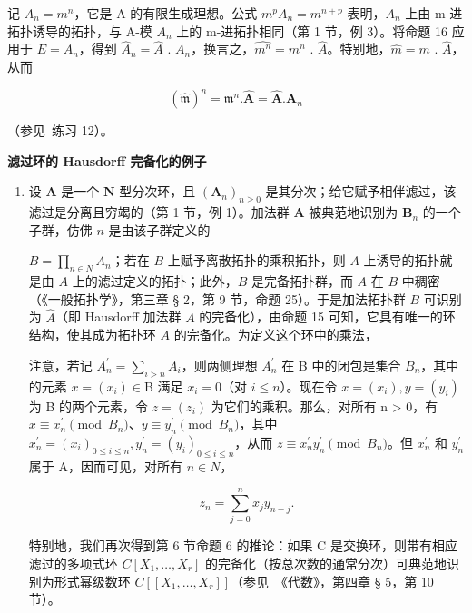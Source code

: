 记 \(A_{n} = m^{n}\)，它是 A 的有限生成理想。公式 \(m^{p}A_{n} = m^{n+p}\) 表明，\(A_{n}\) 上由 m-进拓扑诱导的拓扑，与 A-模 \(A_{n}\) 上的 m-进拓扑相同（第 1 节，例 3）。将命题 16 应用于 \(E = A_{n}\)，得到 \(\hat{A}_{n} = \hat{A}\) . \(A_{n}\)，换言之，\(\widehat{m^{n}} = m^{n}\) . \(\hat{A}\)。特别地，\(\hat{m} = m\) . \(\hat{A}\)，从而

\[
(\hat {\mathfrak {m}}) ^ {n} = \mathfrak {m} ^ {n}. \hat {\mathbf {A}} = \hat {\mathbf {A}}. \mathbf {A} _ {n}
\]

（参见~练习 12）。

\textbf{滤过环的 Hausdorff 完备化的例子}\par

\begin{enumerate}
\def\labelenumi{(\arabic{enumi})}
\tightlist
\item
  设 \(\mathbf{A}\) 是一个 \(\mathbf{N}\) 型分次环，且 \((\mathbf{A}_n)_{n\geqslant 0}\) 是其分次；给它赋予相伴滤过，该滤过是分离且穷竭的（第 1 节，例 1）。加法群 \(\mathbf{A}\) 被典范地识别为 \(\mathbf{B}_{n}\) 的一个子群，仿佛 \(n\) 是由该子群定义的

\(B = \prod_{n \in N} A_n\)；若在 \(B\) 上赋予离散拓扑的乘积拓扑，则 \(A\) 上诱导的拓扑就是由 \(A\) 上的滤过定义的拓扑；此外，\(B\) 是完备拓扑群，而 \(A\) 在 \(B\) 中稠密（《一般拓扑学》，第三章 § 2，第 9 节，命题 25）。于是加法拓扑群 \(B\) 可识别为 \(\hat{A}\)（即 Hausdorff 加法群 \(A\) 的完备化），由命题 15 可知，它具有唯一的环结构，使其成为拓扑环 \(A\) 的完备化。为定义这个环中的乘法，

注意，若记 \(A_{n}^{\prime} = \sum_{i > n} A_{i}\)，则两侧理想 \(A_{n}^{\prime}\) 在 B 中的闭包是集合 \(B_{n}\)，其中的元素 \(x = (x_{i}) \in \mathrm{B}\) 满足 \(x_{i} = 0\)（对 \(i \leqslant n\)）。现在令 \(x = (x_{i}), y = (y_{i})\) 为 B 的两个元素，令 \(z = (z_{i})\) 为它们的乘积。那么，对所有 n \textgreater{} 0，有 \(x \equiv x_{n}^{\prime} \pmod{B_{n}}\)、\(y \equiv y_{n}^{\prime} \pmod{B_{n}}\)，其中 \(x_{n}^{\prime} = (x_{i})_{0 \leqslant i \leqslant n}, y_{n}^{\prime} = (y_{i})_{0 \leqslant i \leqslant n}\)，从而 \(z \equiv x_{n}^{\prime} y_{n}^{\prime} \pmod{B_{n}}\)。但 \(x_{n}^{\prime}\) 和 \(y_{n}^{\prime}\) 属于 A，因而可见，对所有 \(n \in N\)，

\[
z _ {n} = \sum_ {j = 0} ^ {n} x _ {j} y _ {n - j}.\tag{26}
\]

特别地，我们再次得到第 6 节命题 6 的推论：如果 C 是交换环，则带有相应滤过的多项式环 \(C[X_{1},\ldots,X_{r}]\) 的完备化（按总次数的通常分次）可典范地识别为形式幂级数环 \(C[[X_{1},\ldots,X_{r}]]\)（参见~《代数》，第四章 § 5，第 10 节）。
\end{enumerate}

